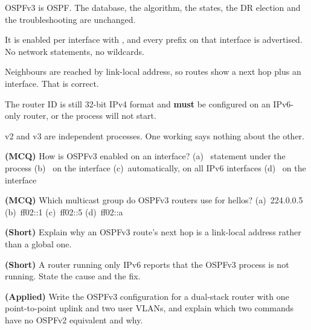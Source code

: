 \begin{chaptersummary}
\begin{tight}
  \item OSPFv3 is OSPF. The database, the algorithm, the states, the DR election
        and the troubleshooting are unchanged.
  \item It is enabled per interface with , and every
        prefix on that interface is advertised. No network statements, no
        wildcards.
  \item Neighbours are reached by link-local address, so routes show a
         next hop plus an interface. That is correct.
  \item The router ID is still 32-bit IPv4 format and \textbf{must} be configured
        on an IPv6-only router, or the process will not start.
  \item v2 and v3 are independent processes. One working says nothing about the
        other.
\end{tight}
\end{chaptersummary}

\begin{reviewq}
  \item \textbf{(MCQ)} How is OSPFv3 enabled on an interface?
        (a)~ statement under the process
        (b)~ on the interface
        (c)~automatically, on all IPv6 interfaces
        (d)~ on the interface
  \item \textbf{(MCQ)} Which multicast group do OSPFv3 routers use for hellos?
        (a)~224.0.0.5 (b)~ff02::1 (c)~ff02::5 (d)~ff02::a
  \item \textbf{(Short)} Explain why an OSPFv3 route's next hop is a link-local
        address rather than a global one.
  \item \textbf{(Short)} A router running only IPv6 reports that the OSPFv3
        process is not running. State the cause and the fix.
  \item \textbf{(Applied)} Write the OSPFv3 configuration for a dual-stack router
        with one point-to-point uplink and two user VLANs, and explain which two
        commands have no OSPFv2 equivalent and why.
\end{reviewq}
